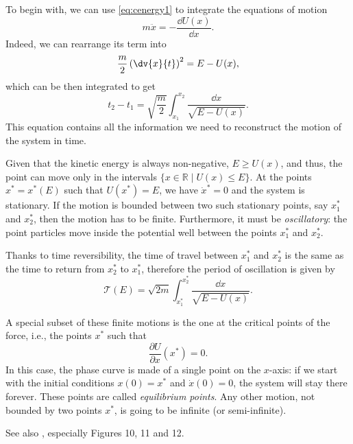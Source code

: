 \documentclass[english,fontsize=11pt,paper=b5]{scrbook}
\numberwithin{equation}{chapter}
\theoremstyle{definition}
\begin{document}
    To begin with, we can use \eqref{eq:cenergy1} to integrate the equations of motion
    \begin{equation}
      m \ddot x = - \frac{\dd U(x)}{\dd x}.
    \end{equation}
    Indeed, we can rearrange its term into
    \begin{equation}
      \frac m2 \left(\dv{x}{t}\right)^2 = E - U(x),
    \end{equation}
    which can be then integrated to get
    \begin{equation}
      t_2 - t_1 = \sqrt{\frac m2} \int_{x_1}^{x_2} \frac{\dd x}{\sqrt{E-U(x)}}.
    \end{equation}
    This equation contains all the information we need to reconstruct the motion of the system in time.

    Given that the kinetic energy is always non-negative, $E \geq U(x)$, and thus, the point can move only in the intervals $\{ x\in\mathbb{R} \mid U(x) \leq E\}$. At the points $x^* = x^*(E)$ such that $U(x^*) = E$, we have $\dot x^* = 0$ and the system is stationary. If the motion is bounded between two such stationary points, say $x_1^*$ and $x_2^*$, then the motion has to be finite.
    Furthermore, it must be \emph{oscillatory}: the point particles move inside the potential well between the points $x_1^*$ and $x_2^*$.

    Thanks to time reversibility, the time of travel between $x_1^*$ and $x_2^*$ is the same as the time to return from $x_2^*$ to $x_1^*$, therefore the period of oscillation is given by
    \begin{equation}\label{eq:osc}
      \mathcal{T}(E) = \sqrt{2m} \int_{x^*_1}^{x^*_2} \frac{\dd x}{\sqrt{E-U(x)}}.
    \end{equation}

    A special subset of these finite motions is the one at the critical points of the force, i.e., the points $x^*$ such that
    \begin{equation}
      \frac{\partial U}{\partial x}(x^*) = 0.
    \end{equation}
    In this case, the phase curve is made of a single point on the $x$-axis: if we start with the initial conditions $x(0) = x^*$ and $\dot x(0) = 0$, the system will stay there forever. These points are called \emph{equilibrium points}.
    Any other motion, not bounded by two points $x^*$, is going to be infinite (or semi-infinite).

    See also \cite[Chapter 2.4]{book:arnold}, especially Figures 10, 11 and 12.
\end{document}
